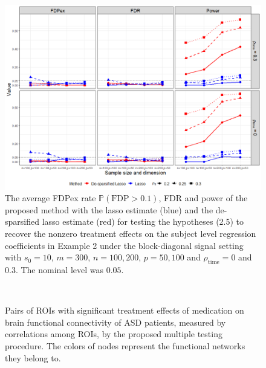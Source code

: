 \documentclass[12pt]{article}
\numberwithin{equation}{section}
\begin{document}
\begin{figure}[t]
	\centering
	\includegraphics[width=\linewidth]{New-plot-lasso.png}
	\caption{The average FDPex rate $\mathbb{P}(\mbox{FDP} > 0.1)$, FDR and power of the proposed method with the lasso estimate (blue) and the de-sparsified lasso estimate (red) for testing the hypotheses (2.5) to recover the nonzero treatment effects on the subject level regression coefficients in Example 2 under the block-diagonal signal setting with $s_0 = 10$, $m = 300$, $n = 100, 200$, $p = 50, 100$ and $\rho_{\mathrm{\scriptstyle time}} = 0$ and $0.3$. The nominal level was $0.05$.}
	\label{simulation3}
\end{figure}

\begin{figure}[h]
	\centering
	
	 \ \ \
	\caption{Pairs of ROIs with significant treatment effects of medication on brain functional connectivity of ASD patients, measured by correlations among ROIs, by the proposed multiple testing procedure. The colors of nodes represent the functional networks they belong to.
	}
	\label{Causalconnection}
\end{figure}
\end{document}
